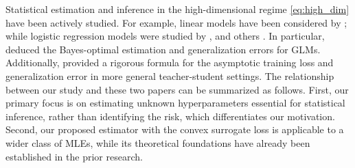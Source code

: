 \documentclass[12pt,reqno]{amsart}
\newcommand{\rc}{\color{black}}
\newcommand{\cc}{\color{black}}
\begin{document}
Statistical estimation and inference in the high-dimensional regime \eqref{eq:high_dim} have been actively studied.
For example, linear models have been considered by \cite{bayati2011dynamics,el2013robust,thrampoulidis2015lasso,thrampoulidis2018precise,takahashi2018statistical,el2018impact,miolane2021distribution,hastie2022surprises,mei2022generalization,bellec2025error}; {\cc while logistic regression models were studied by  }\cite{sur2019likelihood,sur2019modern}, and others \citep{tan2023multinomial,bellec2025observable,loureiro2021learning,sawaya2024high}. In particular, 
{\rc
\cite{barbier2019optimal} deduced the Bayes-optimal estimation and generalization errors for GLMs.
Additionally, \cite{loureiro2021learning} provided a rigorous formula for the asymptotic training loss and generalization error in more general teacher-student settings.
The relationship between our study and these two papers can be summarized as follows.
First, our primary focus is on estimating unknown hyperparameters essential for statistical inference, rather than identifying the risk, which differentiates our motivation.
Second, our proposed estimator with the convex surrogate loss is applicable to a wider class of MLEs, while 
its theoretical foundations 
have already been established in the prior research.
}
\end{document}
